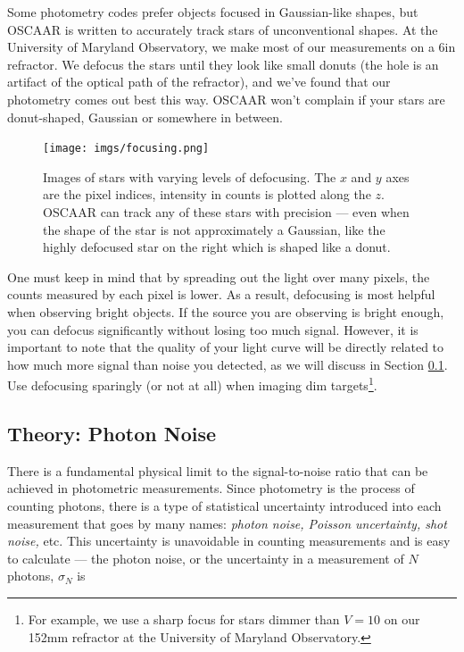 \documentclass[a4paper]{article}
\begin{document}
Some photometry codes prefer objects focused in Gaussian-like shapes, but OSCAAR is written to accurately track stars of unconventional shapes. At the University of Maryland Observatory, we make most of our measurements on a 6in refractor. We defocus the stars until they look like small donuts (the hole is an artifact of the optical path of the refractor), and we've found that our photometry comes out best this way. OSCAAR won't complain if your stars are donut-shaped, Gaussian or somewhere in between. 

\begin{figure}[H]
\begin{center}
\texttt{[image: imgs/focusing.png]}
\caption{Images of stars with varying levels of defocusing. The $x$ and $y$ axes are the pixel indices, intensity in counts is plotted along the $z$. OSCAAR can track any of these stars with precision --- even when the shape of the star is not approximately a Gaussian, like the highly defocused star on the right which is shaped like a donut.}
\label{fig:defocus}
\end{center}
\end{figure}

One must keep in mind that by spreading out the light over many pixels, the counts measured by each pixel is lower. As a result, defocusing is most helpful when observing bright objects. If the source you are observing is bright enough, you can defocus significantly without losing too much signal. However, it is important to note that the quality of your light curve will be directly related to how much more signal than noise you detected, as we will discuss in Section \ref{sec:photonNoise}. Use defocusing sparingly (or not at all) when imaging dim targets\footnote{For example, we use a sharp focus for stars dimmer than $V=10$ on our 152mm refractor at the University of Maryland Observatory.}.

\subsection{Theory: Photon Noise} \label{sec:photonNoise}

There is a fundamental physical limit to the signal-to-noise ratio that can be achieved in photometric measurements. Since photometry is the process of counting photons, there is a type of statistical uncertainty introduced into each measurement that goes by many names: \textit{photon noise, Poisson uncertainty, shot noise,} etc. This uncertainty is unavoidable in counting measurements and is easy to calculate --- the photon noise, or the uncertainty in a measurement of $N$ photons, $\sigma_N$ is
\end{document}
